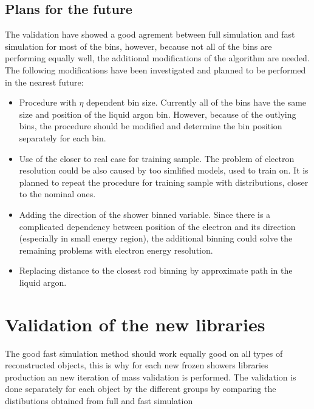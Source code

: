 {\subsection{Plans for the future}\label{sec:FSImpr}

The validation have showed a good agrement between full simulation and fast simulation for most of the bins, however, because not all of the bins are performing equally well, the additional modifications of the algorithm are needed. The following modifications have been investigated and planned to be performed in the nearest future:
\begin{itemize}
\item Procedure with $\eta$ dependent bin size. Currently all of the bins have the same size and position of the liquid argon bin. However, because of the outlying bins, the procedure should be modified and determine the bin position separately for each bin.
\item Use of the closer to real case for training sample. The problem of electron resolution could be also caused by too simlified models, used to train on. It is planned to repeat the procedure for training sample with distributions, closer to the nominal ones.
\item Adding the direction of the shower binned variable. Since there is a complicated dependency between position of the electron and its direction (especially in small energy region), the additional binning could solve the remaining problems with electron energy resolution.
\item Replacing distance to the closest rod binning by approximate path in the liquid argon. 
\end{itemize}

\section{Validation of the new libraries}\label{sec:FSValidation}

The good fast simulation method should work equally good on all types of reconstructed objects, this is why for each new frozen showers libraries production an new iteration of mass validation is performed. The validation is done separately for each object by the different groups by comparing the distibutions obtained from full and fast simulation

}
